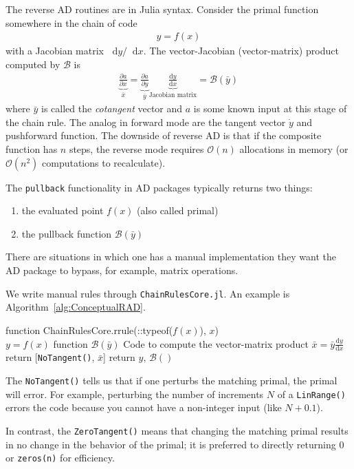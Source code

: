 \documentclass[10pt]{article}
\newcommand{\diff}{\mathop{}\!\tn{d}} %
\newcommand{\pp}[2]{\frac{\partial #1}{\partial #2}}
\newcommand{\dd}[2]{\frac{\textrm{d} #1}{\textrm{d} #2}}
\newcommand{\mcal}[1]{\mathcal{#1}} %
\newcommand{\ben}{\begin{eqnarray*}}
\newcommand{\een}{\end{eqnarray*}}
\newcommand{\BigO}{\mathcal{O}}
\newcommand{\tn}[1]{\textrm{#1}}
\begin{document}
The reverse AD routines are in Julia syntax.
Consider the primal function somewhere in the chain of code
\ben
y = f(x)
\een
with a Jacobian matrix $\diff y/\diff x$.
The vector-Jacobian (vector-matrix) product computed by $\mcal{B}$ is
\ben
\underbrace{\pp{a}{x}}_{\bar{x}} =
\underbrace{\pp{a}{y}}_{\bar{y}}
\underbrace{\dd{y}{x}}_{\tn{Jacobian matrix}}
= \mcal{B}({\bar{y}})
\een
where $\bar{y}$ is called the \emph{cotangent} vector and $a$ is some known input at this stage of the chain rule.
The analog in forward mode are the tangent vector $\dot{y}$ and pushforward function.
The downside of reverse AD is that if the composite function has $n$ steps, the reverse mode requires $\BigO(n)$ allocations in memory (or $\BigO(n^2)$ computations to recalculate).

The \texttt{pullback} functionality in AD packages typically returns two things:
\begin{enumerate}
	\item the evaluated point $f(x)$ (also called primal)
	\item the pullback function $\mcal{B}(\bar{y})$
\end{enumerate}
There are situations in which one has a manual implementation they want the {AD} package to bypass, for example, matrix operations.

We write manual rules through \texttt{ChainRulesCore.jl}.
An example is Algorithm~\ref{alg:ConceptualRAD}.
\begin{algorithm}[htb!]
	\caption{\label{alg:ConceptualRAD} Basic reverse rule in Julia ChainRulesCore for some function $f(x)$}
	\DontPrintSemicolon
	function ChainRulesCore.rrule(::typeof($f(x)$), $x$)\\
	\quad $y = f(x)$ 
	\quad function $\mcal{B}(\bar{y})$\;
	\quad \quad Code to compute the vector-matrix product $\bar{x}= \bar{y} \dd{y}{x}$ 
	\quad return [\texttt{NoTangent()}, $\bar{x}$] 
	return $y$, $\mcal{B}()$
\end{algorithm}

The \texttt{NoTangent()} tells us that if one perturbs the matching primal, the primal will error.
For example, perturbing the number of increments $N$ of a \texttt{LinRange()} errors the code because you cannot have a non-integer input (like $N+0.1$).

In contrast, the \texttt{ZeroTangent()} means that changing the matching primal results in no change in the behavior of the primal;
it is preferred to directly returning 0 or \texttt{zeros(n)} for efficiency.
\end{document}
